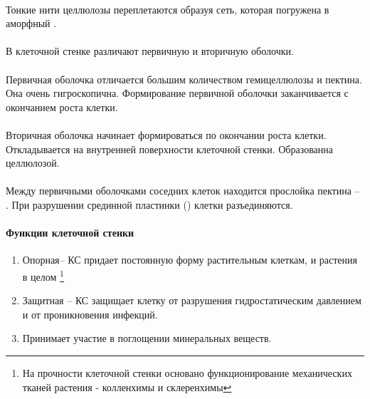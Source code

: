 \paragraph*{}Тонкие нити целлюлозы переплетаются образуя сеть, которая погружена в аморфный .

\paragraph*{}

\paragraph*{}В клеточной стенке различают первичную и вторичную оболочки.

\paragraph*{}Первичная оболочка отличается большим количеством гемицеллюлозы и пектина. Она очень гигроскопична. Формирование первичной оболочки заканчивается с окончанием роста клетки.

\paragraph*{}Вторичная оболочка начинает формироваться по окончании роста клетки. Откладывается на внутренней поверхности клеточной стенки. Образованна целлюлозой.

\paragraph*{}Между первичными оболочками соседних клеток находится прослойка пектина -- . При разрушении срединной пластинки () клетки разъединяются.

\paragraph{Функции клеточной стенки}

\begin{enumerate}

	\item Опорная-- КС придает постоянную форму растительным клеткам, и растения в целом \footnote{На прочности клеточной стенки основано функционирование механических тканей растения - колленхимы и склеренхимы}
	\item Защитная -- КС защищает клетку от разрушения гидростатическим давлением и от проникновения инфекций.
	\item Принимает участие в поглощении минеральных веществ.

\end{enumerate}

